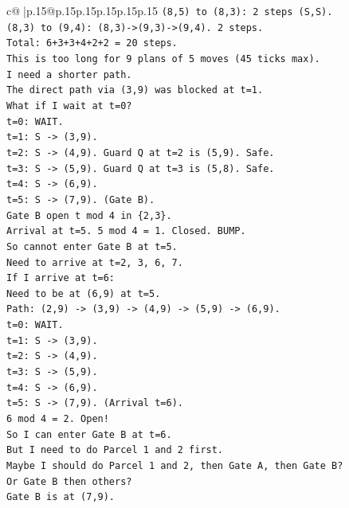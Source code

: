 \documentclass{article}
\begin{document}
{\begin{supertabular}{c@{$\;$}|p{.15\linewidth}@{}p{.15\linewidth}p{.15\linewidth}p{.15\linewidth}p{.15\linewidth}p{.15\linewidth}}
{{{\texttt{(8,5) to (8,3): 2 steps (S,S).} \\
\texttt{(8,3) to (9,4): (8,3){-}>(9,3){-}>(9,4). 2 steps.} \\
\texttt{Total: 6+3+3+4+2+2 = 20 steps.} \\
\texttt{This is too long for 9 plans of 5 moves (45 ticks max).} \\
\texttt{I need a shorter path.} \\
\texttt{The direct path via (3,9) was blocked at t=1.} \\
\texttt{What if I wait at t=0?} \\
\texttt{t=0: WAIT.} \\
\texttt{t=1: S {-}> (3,9).} \\
\texttt{t=2: S {-}> (4,9). Guard Q at t=2 is (5,9). Safe.} \\
\texttt{t=3: S {-}> (5,9). Guard Q at t=3 is (5,8). Safe.} \\
\texttt{t=4: S {-}> (6,9).} \\
\texttt{t=5: S {-}> (7,9). (Gate B).} \\
\texttt{Gate B open t mod 4 in \{2,3\}.} \\
\texttt{Arrival at t=5. 5 mod 4 = 1. Closed. BUMP.} \\
\texttt{So cannot enter Gate B at t=5.} \\
\texttt{Need to arrive at t=2, 3, 6, 7.} \\
\texttt{If I arrive at t=6:} \\
\texttt{Need to be at (6,9) at t=5.} \\
\texttt{Path: (2,9) {-}> (3,9) {-}> (4,9) {-}> (5,9) {-}> (6,9).} \\
\texttt{t=0: WAIT.} \\
\texttt{t=1: S {-}> (3,9).} \\
\texttt{t=2: S {-}> (4,9).} \\
\texttt{t=3: S {-}> (5,9).} \\
\texttt{t=4: S {-}> (6,9).} \\
\texttt{t=5: S {-}> (7,9). (Arrival t=6).} \\
\texttt{6 mod 4 = 2. Open!} \\
\texttt{So I can enter Gate B at t=6.} \\
\texttt{But I need to do Parcel 1 and 2 first.} \\
\texttt{Maybe I should do Parcel 1 and 2, then Gate A, then Gate B?} \\
\texttt{Or Gate B then others?} \\
\texttt{Gate B is at (7,9).} \\
}}}
\end{supertabular}}
\end{document}
